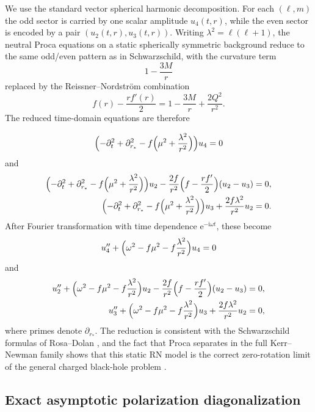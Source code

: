 \documentclass[12pt]{article}
\numberwithin{equation}{section}
\theoremstyle{plain}
\theoremstyle{definition}
\theoremstyle{remark}
\newcommand{\ii}{\mathrm i}
\newcommand{\ee}{\mathrm e}
\newcommand{\la}{\lambda}
\newcommand{\om}{\omega}
\begin{document}
We use the standard vector spherical harmonic decomposition.  For each $(\ell,m)$ the odd sector is carried by one scalar amplitude $u_4(t,r)$, while the even sector is encoded by a pair $(u_2(t,r),u_3(t,r))$.  Writing $\la^2=\ell(\ell+1)$, the neutral Proca equations on a static spherically symmetric background reduce to the same odd/even pattern as in Schwarzschild, with the curvature term
\[
   1-\frac{3M}{r}
\]
replaced by the Reissner--Nordstr\"om combination
\[
   f(r)-\frac{r f'(r)}{2}
   =
   1-\frac{3M}{r}+\frac{2Q^2}{r^2}.
\]
The reduced time-domain equations are therefore

\begin{equation}\label{eq:odd_time_domain}
   \Bigl(
      -\partial_t^2+\partial_{r_*}^2
      -f\Bigl(\mu^2+\frac{\la^2}{r^2}\Bigr)
   \Bigr)u_4=0
\end{equation}
and
\begin{align}
   \Bigl(
      -\partial_t^2+\partial_{r_*}^2
      -f\Bigl(\mu^2+\frac{\la^2}{r^2}\Bigr)
   \Bigr)u_2
   -\frac{2f}{r^2}\Bigl(f-\frac{r f'}{2}\Bigr)(u_2-u_3)&=0,
   \label{eq:even_time_domain_1}
   \\
   \Bigl(
      -\partial_t^2+\partial_{r_*}^2
      -f\Bigl(\mu^2+\frac{\la^2}{r^2}\Bigr)
   \Bigr)u_3
   +\frac{2f\la^2}{r^2}u_2&=0.
   \label{eq:even_time_domain_2}
\end{align}
After Fourier transformation with time dependence $\ee^{-\ii\om t}$, these become
\begin{equation}\label{eq:odd_frequency_domain}
   u_4''+\Bigl(\om^2-f\mu^2-f\frac{\la^2}{r^2}\Bigr)u_4=0
\end{equation}
and
\begin{align}
   u_2''+\Bigl(\om^2-f\mu^2-f\frac{\la^2}{r^2}\Bigr)u_2
   -\frac{2f}{r^2}\Bigl(f-\frac{r f'}{2}\Bigr)(u_2-u_3)&=0,
   \label{eq:even_frequency_domain_1}
   \\
   u_3''+\Bigl(\om^2-f\mu^2-f\frac{\la^2}{r^2}\Bigr)u_3
   +\frac{2f\la^2}{r^2}u_2&=0,
   \label{eq:even_frequency_domain_2}
\end{align}
where primes denote $\partial_{r_*}$.  The reduction is consistent with the Schwarzschild formulas of Rosa--Dolan \cite{RosaDolan2012}, and the fact that Proca separates in the full Kerr--Newman family shows that this static RN model is the correct zero-rotation limit of the general charged black-hole problem \cite{CayusoDiasGrayKubiznakMargalitSantosSouzaThiele2020}.

\subsection{Exact asymptotic polarization diagonalization}
\end{document}
